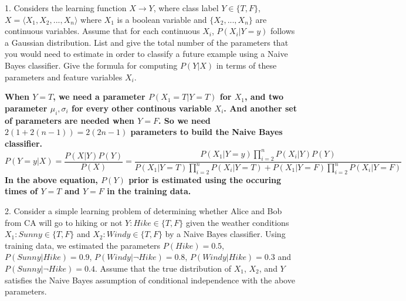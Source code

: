 \documentclass{article}
\theoremstyle{definition}
\theoremstyle{definition}
\theoremstyle{remark}
\begin{document}
1. Considers the learning function $X \rightarrow Y$, where class label $Y\in\{T,F\}$, $X=\langle X_1,X_2,...,X_n \rangle$ where $X_1$ is a boolean variable and $\{X_2,...,X_n\}$ are continuous variables. Assume that for each continuous $X_i$, $P(X_i|Y=y)$ follows a Gaussian distribution. List and give the total number of the parameters that you would need to estimate in order to classify a future example using a Naive Bayes classifier.
Give the formula for computing $P(Y|X)$ in terms of these
parameters and feature variables $X_i$.

\begin{addmargin}[3em]{2em}
  \textbf{When $Y = T$, we need a parameter $P(X_1 = T | Y = T)$ for $X_1$, and two parameter $\mu_i, \sigma_i$ for every other continous variable $X_i$. And another set of parameters are needed when $Y = F$. So we need $2(1 + 2(n-1)) = 2(2n-1)$ parameters to build the Naive Bayes classifier.}\\

  \[
  P(Y=y|X) = \frac{P(X|Y)P(Y)}{P(X)} = \frac{P(X_1|Y=y) \prod_{i=2}^n P(X_i|Y) P(Y)}{P(X_1|Y=T) \prod_{i=2}^n P(X_i|Y=T) + P(X_1|Y=F) \prod_{i=2}^n P(X_i|Y=F) }
  \]
  \textbf{In the above equation, $P(Y)$ prior is estimated using the occuring times of $Y=T$ and $Y=F$ in the training data.}
\end{addmargin}

2. Consider a simple learning problem of determining whether Alice and Bob from CA will go to hiking or not
$Y:Hike\in\{T,F\}$ given the weather conditions $X_1:Sunny\in\{T,F\}$ and $X_2:Windy\in\{T,F\}$ by a
Naive Bayes classifier. Using training data, we estimated the parameters $P(Hike) = 0.5$, $P(Sunny|Hike) = 0.9$, $P(Windy|\neg Hike) = 0.8$, $P(Windy|Hike) = 0.3$ and $P(Sunny|\neg Hike) = 0.4$. Assume that the true distribution of $X_1$, $X_2$, and $Y$ satisfies the Naive Bayes
assumption of conditional independence with the above parameters.
\end{document}
